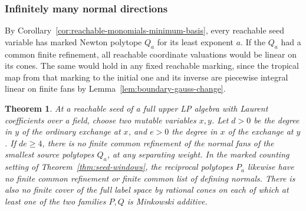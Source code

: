 \documentclass[11pt,reqno]{amsart}
\numberwithin{equation}{section}
\newtheorem{theorem}{Theorem}[section]
\theoremstyle{definition}
\theoremstyle{remark}
\begin{document}
\subsubsection{Infinitely many normal directions}

By Corollary~\ref{cor:reachable-monomials-minimum-basis}, every
reachable seed variable has marked Newton polytope \(Q_a\) for its
least exponent \(a\). If the \(Q_a\)
had a common finite refinement, all reachable coordinate valuations
would be linear on its cones. The same would hold in any fixed
reachable marking, since the tropical map from that marking to the
initial one and its inverse are piecewise integral linear on finite
fans by Lemma~\ref{lem:boundary-gauss-change}.

\begin{theorem}\label{thm:mutual-degrees-infinite-fan}
At a reachable seed of a full upper LP algebra with Laurent
coefficients over a field, choose two mutable variables \(x,y\).
Let \(d>0\) be the degree in \(y\) of the ordinary exchange at \(x\),
and \(e>0\) the degree in \(x\) of the exchange at \(y\). If
\(de\ge4\), there is no finite common refinement of the normal fans
of the smallest source polytopes \(Q_a\), at any separating weight.
In the marked counting setting of Theorem~\ref{thm:seed-windows},
the reciprocal polytopes \(P_a\) likewise have no finite common
refinement or finite common list of defining normals. There is
also no finite cover of the full label space by rational cones on
each of which at least one of the two families \(P,Q\) is
Minkowski additive.
\end{theorem}
\end{document}
